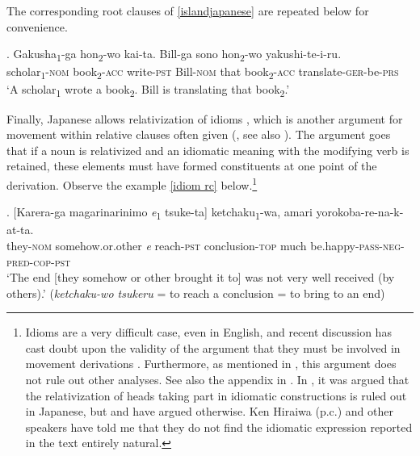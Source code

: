 The corresponding root clauses of \ref{islandjapanese} are repeated below for convenience.

\exg. Gakusha\textsubscript{1}-ga hon\textsubscript{2}-wo kai-ta. Bill-ga sono hon\textsubscript{2}-wo yakushi-te-i-ru.\\
scholar\textsubscript{1}-\textsc{nom} book\textsubscript{2}-\textsc{acc} write-\textsc{pst} Bill-\textsc{nom} that book\textsubscript{2}-\textsc{acc} translate-\textsc{ger}-be-\textsc{prs}\\
`A scholar\textsubscript{1} wrote a book\textsubscript{2}. Bill is translating that book\textsubscript{2}.’

\largerpage[-4]
Finally, Japanese allows relativization of idioms \citep{inoue:1976:togo, ishii:1991:operators, miyamoto:2017:RC, whitman:2013:prehead}, which is another argument for movement within relative clauses often given (\citealt{schachter:1973:focus, carlson:1977:amount}, see also \citealt{bhatt:2002:raising, bhatt:2015:rc, sauerland:2003:a, cinque:2020:relcl}). The argument goes that if a noun is relativized and an idiomatic meaning with the modifying verb is retained, these elements must have formed constituents at one point of the derivation. Observe the example \ref{idiom rc} below.\footnote{Idioms are a very difficult case, even in English, and recent discussion has cast doubt upon the validity of the argument that they must be involved in movement derivations \citep{heycock:2019:relative, webelhuth:2019:idioms}. Furthermore, as mentioned in \citet[48]{bhatt:2002:raising}, this argument does not rule out other analyses. See also the appendix in \citet{cinque:2020:relcl}. In \citet{hoshi:2004:para}, it was argued that the relativization of heads taking part in idiomatic constructions is ruled out in Japanese, but \citet{inoue:1976:togo, whitman:2013:prehead} and \citet{miyamoto:2017:RC} have argued otherwise. Ken Hiraiwa (p.c.) and other speakers have told me that they do not find the idiomatic expression reported in the text entirely natural.} 

\exg. [Karera-ga magarinarinimo \textit{e}\textsubscript{1} tsuke-ta] ketchaku\textsubscript{1}-wa, amari yorokoba-re-na-k-at-ta.\\
they-\textsc{nom} somehow.or.other \textit{e} reach-\textsc{pst} conclusion-\textsc{top} much be.happy-\textsc{pass-neg-pred-cop-pst}\\
`The end [they somehow or other brought it to] was not very well received (by others).’ (\textit{ketchaku-wo tsukeru} = to reach a conclusion = to bring to an end) \\ \null \hfill \citep[214]{inoue:1976:togo} \label{idiom rc}

